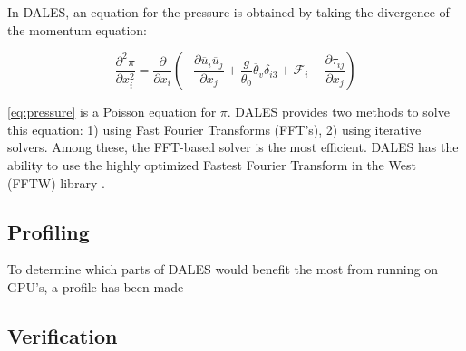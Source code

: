In DALES, an equation for the pressure is obtained by taking the divergence of the momentum equation:

\begin{equation}
    \frac{\partial^2 \pi}{\partial x_i^2} = \frac{\partial }{\partial x_i} \left( - \frac{\partial \overline{u}_i \overline{u}_j}{\partial x_j} + \frac{g}{\theta_0}\overline{\theta}_v\delta_{i3} + \mathcal{F}_i - \frac{\partial \tau_{ij}}{\partial x_j} \right) \label{eq:pressure}
\end{equation}

\noindent \autoref{eq:pressure} is a Poisson equation for $\pi$. DALES provides two methods to solve this equation: 1) using Fast Fourier Transforms (FFT's), 2) using iterative solvers. Among these, the FFT-based solver is the most efficient. DALES has the ability to use the highly optimized Fastest Fourier Transform in the West (FFTW) library \citep{FFTW97}. 

\subsection{Profiling}
To determine which parts of DALES would benefit the most from running on GPU's, a profile has been made 

\subsection{Verification}
